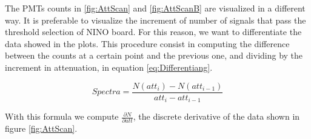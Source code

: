 The PMTs counts in \ref{fig:AttScan} and \ref{fig:AttScanB} are visualized in a different way. It is preferable to visualize the increment of number of signals that pass the threshold selection of NINO board. For this reason, we want to differentiate the data showed in the plots. This procedure consist in computing the difference between the counts at a certain point and the previous one, and dividing by the increment in attenuation, in equation \ref{eq:Differentiang}.

\begin{equation} \label{eq:Differentiang}
Spectra = \frac{N(att_{i}) - N(att_{i-1})}{att_{i} - att_{i-1}} 
\end{equation}

With this formula we compute $\frac{\partial N}{\partial att}$, the discrete derivative of the data shown in figure \ref{fig:AttScan}.

